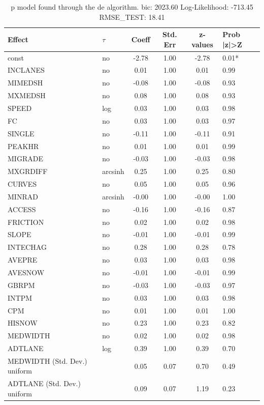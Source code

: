 \begin{table}
	\caption{p model found through the de algorithm. bic: 2023.60 Log-Likelihood: -713.45 RMSE_TEST: 18.41}
	\begin{center}
		\begin{tabular}{|l|l|c|c|c|l|}
			\hline
			Effect & $\tau$ & Coeff & Std. Err & z-values & Prob |z|>Z \\
			\hline
			const & no & -2.78 & 1.00 & -2.78 & 0.01* \\
			\hline
			INCLANES & no & 0.01 & 1.00 & 0.01 & 0.99 \\
			\hline
			MIMEDSH & no & -0.08 & 1.00 & -0.08 & 0.93 \\
			\hline
			MXMEDSH & no & 0.08 & 1.00 & 0.08 & 0.93 \\
			\hline
			SPEED & log & 0.03 & 1.00 & 0.03 & 0.98 \\
			\hline
			FC & no & 0.03 & 1.00 & 0.03 & 0.97 \\
			\hline
			SINGLE & no & -0.11 & 1.00 & -0.11 & 0.91 \\
			\hline
			PEAKHR & no & 0.01 & 1.00 & 0.01 & 0.99 \\
			\hline
			MIGRADE & no & -0.03 & 1.00 & -0.03 & 0.98 \\
			\hline
			MXGRDIFF & arcsinh & 0.25 & 1.00 & 0.25 & 0.80 \\
			\hline
			CURVES & no & 0.05 & 1.00 & 0.05 & 0.96 \\
			\hline
			MINRAD & arcsinh & -0.00 & 1.00 & -0.00 & 1.00 \\
			\hline
			ACCESS & no & -0.16 & 1.00 & -0.16 & 0.87 \\
			\hline
			FRICTION & no & 0.02 & 1.00 & 0.02 & 0.98 \\
			\hline
			SLOPE & no & -0.01 & 1.00 & -0.01 & 0.99 \\
			\hline
			INTECHAG & no & 0.28 & 1.00 & 0.28 & 0.78 \\
			\hline
			AVEPRE & no & 0.03 & 1.00 & 0.03 & 0.98 \\
			\hline
			AVESNOW & no & -0.01 & 1.00 & -0.01 & 0.99 \\
			\hline
			GBRPM & no & -0.03 & 1.00 & -0.03 & 0.97 \\
			\hline
			INTPM & no & 0.03 & 1.00 & 0.03 & 0.98 \\
			\hline
			CPM & no & 0.01 & 1.00 & 0.01 & 1.00 \\
			\hline
			HISNOW & no & 0.23 & 1.00 & 0.23 & 0.82 \\
			\hline
			MEDWIDTH & no & 0.02 & 1.00 & 0.02 & 0.98 \\
			\hline
			ADTLANE & log & 0.39 & 1.00 & 0.39 & 0.70 \\
			\hline
			MEDWIDTH (Std. Dev.) uniform &  & 0.05 & 0.07 & 0.70 & 0.49 \\
			\hline
			ADTLANE (Std. Dev.) uniform &  & 0.09 & 0.07 & 1.19 & 0.23 \\
			\hline
		\end{tabular}
	\end{center}
\end{table}